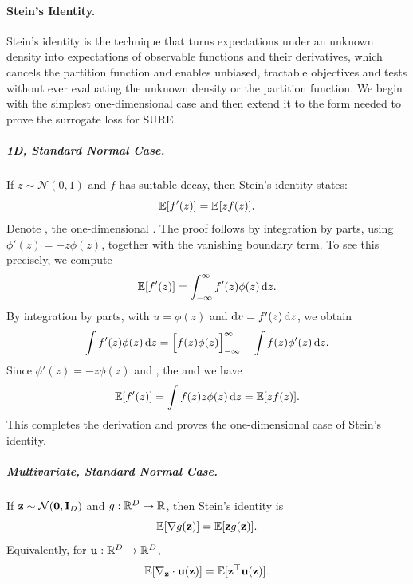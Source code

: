 \paragraph{Stein's Identity.} Stein’s identity is the  technique that turns expectations under an unknown density  into expectations of observable functions and their derivatives, which cancels the partition function and enables unbiased, tractable objectives and tests without ever evaluating the unknown density or the partition function. We begin with the simplest one-dimensional case and then extend it to the form needed to prove the surrogate loss for SURE.
\subparagraph{1D, Standard Normal Case.}
If $z \sim \mathcal{N}(0,1)$ and $f$ has suitable decay, then Stein's identity states:
\[
\mathbb{E}[f'(z)]  =  \mathbb{E}[z f(z)] .
\]
Denote , the one-dimensional .
The proof follows by integration by parts, using $\phi'(z) = -z\phi(z)$, together with the vanishing boundary term. 
To see this precisely, we compute
\[
\mathbb{E}[f'(z)] 
= \int_{-\infty}^{\infty} f'(z)  \phi(z)  \mathop{}\!\mathrm{d} z.
\]
By integration by parts, with $u=\phi(z)$ and $\mathop{}\!\mathrm{d} v=f'(z)  \mathop{}\!\mathrm{d} z$, we obtain
\[
\int f'(z)  \phi(z)  \mathop{}\!\mathrm{d} z
= \Big[ f(z)  \phi(z) \Big]_{-\infty}^{\infty}
- \int f(z)  \phi'(z)  \mathop{}\!\mathrm{d} z.
\]
Since $\phi'(z) = -z\phi(z)$ and , the  and we have
\[
\mathbb{E}[f'(z)]  =  \int f(z)  z  \phi(z)  \mathop{}\!\mathrm{d} z  =  \mathbb{E}[z f(z)].
\]
This completes the derivation and proves the one-dimensional case of Stein's identity.


\subparagraph{Multivariate, Standard Normal Case.}
If ${\mathbf{z}} \sim \mathcal{N}(\mathbf{0},{\mathbf{I}}_D)$ and $g:\mathbb{R}^D \to \mathbb{R}$, then Stein's identity is
\[
\mathbb{E}[\nabla g({\mathbf{z}})]  =  \mathbb{E}[{\mathbf{z}} g({\mathbf{z}})].
\]
Equivalently, for $\mathbf{u}:\mathbb{R}^D \to \mathbb{R}^D$,
\begin{align}\label{eq:stein-multi}
    \mathbb{E}[ \nabla_{{\mathbf{z}}} \cdot\mathbf{u}({\mathbf{z}})]  =  \mathbb{E}[{\mathbf{z}}^\top \mathbf{u}({\mathbf{z}})] .
\end{align}


